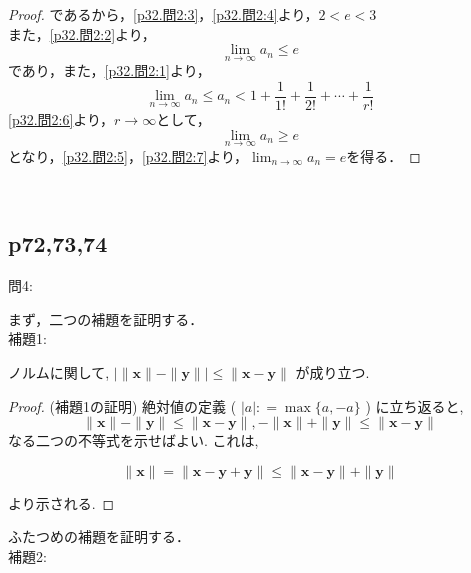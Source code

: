 \documentclass[dvipdfmx,uplatex,11pt]{jsarticle}
\begin{document}
\begin{leftbar}
\begin{proof}
		であるから，\eqref{p32.問2:3}，\eqref{p32.問2:4}より，$2<e<3$\\
		また，\eqref{p32.問2:2}より，
		\begin{equation}
			\label{p32.問2:5}
			\lim_{n \to \infty} a_n \le e
		\end{equation}
		であり，また，\eqref{p32.問2:1}より，
		\begin{equation}
			\label{p32.問2:6}
			\lim_{n \to \infty} a_n \le a_n < 1 + \frac{1}{1!} + \frac{1}{2!} + \cdots + \frac{1}{r!}
		\end{equation}
		\eqref{p32.問2:6}より，$r \to \infty$として，
		\begin{equation}
			\label{p32.問2:7}
			\lim_{n \to \infty} a_n \ge e
		\end{equation}
		となり，\eqref{p32.問2:5}，\eqref{p32.問2:7}より，$\lim_{n \to \infty} a_n =e$を得る．
	\end{proof}
\end{leftbar}
​\newpage
\subsection{p72,73,74}
問4:\par 
まず，二つの補題を証明する．\\
補題1:\par 
	ノルムに関して, $| \| \bm x  \|- \| \bm y \| | \leq \| \bm x - \bm y \|$ が成り立つ. 
\begin{proof} (補題1の証明)
	絶対値の定義 ( $| a | : = \max \{ a , -a \}$ ) に立ち返ると, 
%		
		\[
			\| \bm x  \|- \| \bm y \| \leq \| \bm x - \bm y \| , - \| \bm x  \| + \| \bm y \| \leq \| \bm x - \bm y \|
		\]
%		
	なる二つの不等式を示せばよい. これは, 
		
		\[
			\| \bm x \| = \| \bm x - \bm y + \bm y \| \leq \| \bm x - \bm y \| + \| \bm y \|
		\]
		
	より示される.
\end{proof}
ふたつめの補題を証明する．\\
補題2:\par 
	
\end{document}
